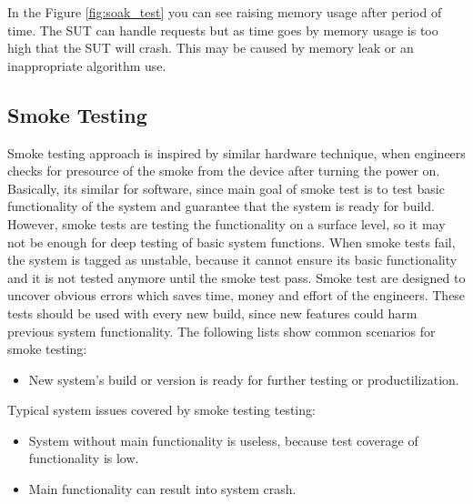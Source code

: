 In the Figure \ref{fig:soak_test} you can see raising memory usage after period of time. The SUT can handle requests but as time goes by memory usage is too high that the SUT will crash. This may be caused by memory leak or an inappropriate algorithm use.

\subsection*{Smoke Testing}
Smoke testing approach is inspired by similar hardware technique, when engineers checks for presource of the smoke from the device after turning the power on. Basically, its similar for software, since main goal of smoke test is to test basic functionality of the system and guarantee that the system is ready for build. However, smoke tests are testing the functionality on a surface level, so it may not be enough for deep testing of basic system functions. When smoke tests fail, the system is tagged as unstable, because it cannot ensure its basic functionality and it is not tested anymore until the smoke test pass. Smoke test are designed to uncover obvious errors which saves time, money and effort of the engineers. These tests should be used with every new build, since new features could harm previous system functionality.
The following lists show common scenarios for smoke testing:
\begin{itemize}
	\setlength\itemsep{0em}
	\item New system's build or version is ready for further testing or productilization.
\end{itemize}
Typical system issues covered by smoke testing testing:
\begin{itemize}
	\setlength\itemsep{0em}
	\item System without main functionality is useless, because test coverage of functionality is low.
	\item Main functionality can result into system crash.
\end{itemize}


